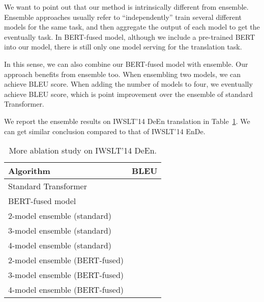 \documentclass{article} \usepackage{iclr2020_conference,times}
\begin{document}
We want to point out that our method is intrinsically different from ensemble. Ensemble approaches usually refer to ``independently'' train several different models for the same task, and then aggregate the output of each model to get the eventually task. In BERT-fused model, although we include a pre-trained BERT into our model, there is still only one model serving for the translation task.

In this sense, we can also combine our BERT-fused model with ensemble. Our approach benefits from ensemble too. When ensembling two models, we can achieve  BLEU score. When adding the number of models to four, we eventually achieve  BLEU score, which is  point improvement over the ensemble of standard Transformer. 


We report the ensemble results on IWSLT'14 DeEn translation in Table~\ref{tab:results_iwslt_de2en-ablation-more_params}. We can get similar conclusion compared to that of IWSLT'14 EnDe. 

\begin{table}[!htbp]
\centering
\caption{More ablation study on IWSLT'14 DeEn.}
\begin{tabular}{lc}
\toprule
Algorithm & BLEU  \\
\midrule
Standard Transformer &  \\
BERT-fused model &  \\
\midrule
2-model ensemble (standard) &   \\
3-model ensemble (standard) &   \\
4-model ensemble (standard) &   \\
\bottomrule
2-model ensemble (BERT-fused) &   \\
3-model ensemble (BERT-fused) &   \\
4-model ensemble (BERT-fused) &   \\
\bottomrule
\end{tabular}
\label{tab:results_iwslt_de2en-ablation-more_params}
\end{table}
\end{document}

